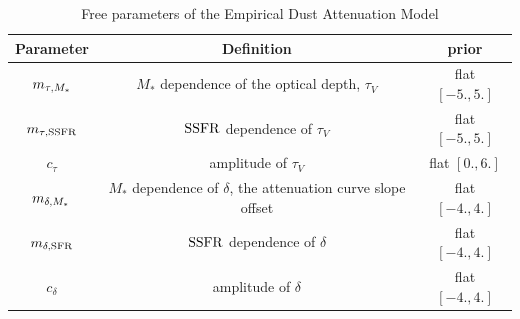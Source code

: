 \begin{table}
    \caption{Free parameters of the Empirical Dust Attenuation Model}
    \begin{center}
        \begin{tabular}{ccc} \toprule
            Parameter & Definition & prior\\[3pt] \hline\hline
            $m_{\tau,M_*}$ & $M_*$ dependence of the optical depth, $\tau_V$ & flat $[-5., 5.]$\\
            $m_{\tau,{\rm SSFR}}$ & ${\rm SSFR}$ dependence of $\tau_V$  & flat $[-5., 5.]$\\
            $c_{\tau}$ & amplitude of $\tau_V$ & flat $[0., 6.]$\\
            $m_{\delta,M_*}$ & $M_*$ dependence of $\delta$, the attenuation curve slope offset & flat $[-4., 4.]$\\
            $m_{\delta,{\rm SFR}}$ & ${\rm SSFR}$ dependence of $\delta$ & flat $[-4., 4.]$\\
            $c_{\delta}$ & amplitude of $\delta$ & flat $[-4., 4.]$\\
            \hline
        \end{tabular} \label{tab:free_param}
    \end{center}
\end{table}
